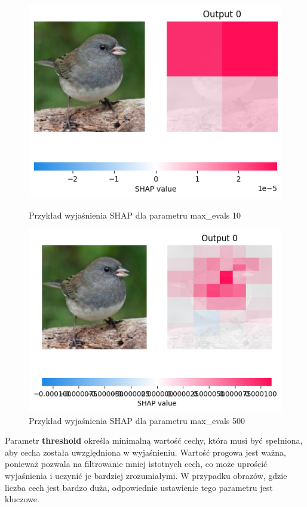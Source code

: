 \begin{figure}
	\centering
	\begin{minipage}[b]{0.3\textwidth}
		\includegraphics[width=.9\textwidth]{img/parameters/shap/max_evals_10}
		\caption{Przykład wyjaśnienia SHAP dla parametru max\_evals 10}  \label{rys:parameters_lime_numsamples_5}
	\end{minipage}
	\begin{minipage}[b]{0.3\textwidth}
		\centering\includegraphics[width=.9\textwidth]{img/parameters/shap/max_evals_500}
		\caption{Przykład wyjaśnienia SHAP dla parametru max\_evals 500}  \label{rys:parameters_lime_numsamples_1000}
	\end{minipage}
\end{figure}
Parametr \textbf{threshold} określa minimalną wartość cechy, która musi być spełniona, aby cecha została uwzględniona w wyjaśnieniu.
Wartość progowa jest ważna, ponieważ pozwala na filtrowanie mniej istotnych cech, co może uprościć wyjaśnienia i uczynić je bardziej zrozumiałymi.
W przypadku obrazów, gdzie liczba cech jest bardzo duża, odpowiednie ustawienie tego parametru jest kluczowe.

